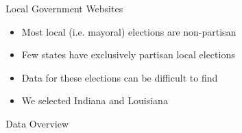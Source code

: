 \documentclass[12pt]{beamer}
\begin{document}
\begin{frame}{Local Government Websites}
\linespread{1.5}
{\large
	\begin{itemize}
		\item Most local (i.e. mayoral) elections are non-partisan
		\item Few states have exclusively partisan local elections
		\item Data for these elections can be difficult to find
		\item We selected Indiana and Louisiana
	\end{itemize}
	
	}
\end{frame}

\begin{frame}{Data Overview}
\begin{figure}
	\hfill
	\hfill
\end{figure}
\end{frame}
\end{document}
